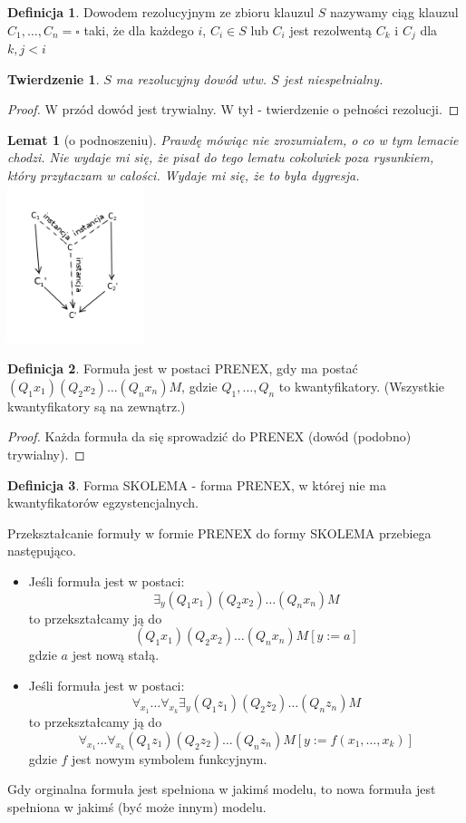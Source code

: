 \documentclass[10pt,a4paper]{article}
\theoremstyle{plain}
\newtheorem{theorem}{Twierdzenie}
\newtheorem{lemma}{Lemat}
\theoremstyle{definition}
\newtheorem*{definition}{Definicja}
\begin{document}
\begin{definition}
 Dowodem rezolucyjnym ze zbioru klauzul $S$ nazywamy ciąg klauzul $C_1, \ldots, C_n = \square$
taki, że dla każdego $i$, $C_i \in S$ lub $C_i$ jest rezolwentą $C_k$ i $C_j$ dla $k,j<i$
\end{definition}
\begin{theorem}
 $S$ ma rezolucyjny dowód wtw. $S$ jest niespełnialny.
\end{theorem}
\begin{proof}
 W przód dowód jest trywialny. W tył - twierdzenie o pełności rezolucji.
\end{proof}
\begin{lemma}[o podnoszeniu]
Prawdę mówiąc nie zrozumiałem, o co w tym lemacie chodzi.
Nie wydaje mi się, że pisał do tego lematu cokolwiek poza rysunkiem,
który przytaczam w całości. Wydaje mi się, że to była dygresja.\\
\centering \includegraphics[width=0.3\textwidth]{img/resolv}
\end{lemma}
\begin{definition}
Formuła jest w postaci PRENEX, gdy ma postać $(Q_1 x_1)(Q_2 x_2)\ldots(Q_n x_n)M$,
gdzie $Q_1, \ldots, Q_n$ to kwantyfikatory. (Wszystkie kwantyfikatory są na zewnątrz.)
\end{definition}
\begin{proof}
Każda formuła da się sprowadzić do PRENEX (dowód (podobno) trywialny).
\end{proof}
\begin{definition}
Forma SKOLEMA - forma PRENEX, w której nie ma kwantyfikatorów egzystencjalnych.
\end{definition}
Przekształcanie formuły w formie PRENEX do formy SKOLEMA przebiega następująco.

\begin{itemize}
 \item Jeśli formuła jest w postaci:
$$\exists_y (Q_1 x_1)(Q_2 x_2)\ldots(Q_n x_n)M$$
to przekształcamy ją do
$$(Q_1 x_1)(Q_2 x_2)\ldots(Q_n x_n)M[y:=a]$$
gdzie $a$ jest nową stałą.
\item Jeśli formuła jest w postaci:
$$\forall_{x_1} \ldots \forall_{x_k} \exists_y (Q_1 z_1)(Q_2 z_2)\ldots(Q_n z_n)M$$
to przekształcamy ją do
$$\forall_{x_1} \ldots \forall_{x_k} (Q_1 z_1)(Q_2 z_2)\ldots(Q_n z_n)M[y:=f(x_1,\ldots,x_k)]$$
gdzie $f$ jest nowym symbolem funkcyjnym.
\end{itemize}
Gdy orginalna formuła jest spełniona w jakimś modelu, to nowa formuła jest spełniona w jakimś (być może innym) modelu.
\end{document}
